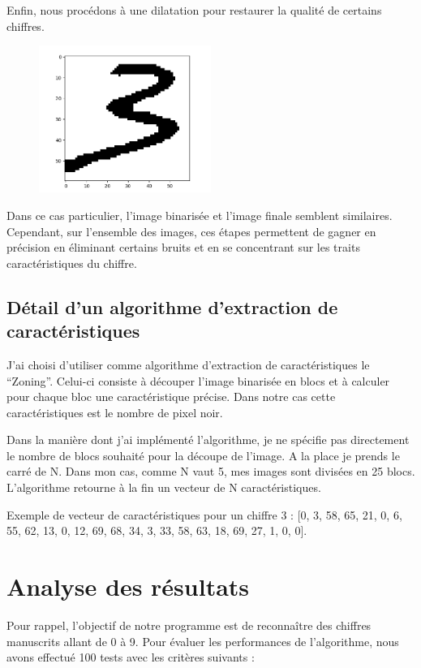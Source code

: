 \documentclass{article}
\begin{document}
Enfin, nous procédons à une dilatation pour restaurer la qualité de certains chiffres.

\begin{figure}[h!]
    \centering
    \includegraphics[width=0.5\textwidth]{images/dilatation_picture.png}
\end{figure}

Dans ce cas particulier, l'image binarisée et l'image finale semblent similaires. Cependant, sur l'ensemble des images, ces étapes permettent de gagner en précision en éliminant certains bruits et en se concentrant sur les traits caractéristiques du chiffre.

\subsection{Détail d’un algorithme d’extraction de caractéristiques}
J'ai choisi d'utiliser comme algorithme d'extraction de caractéristiques le ``Zoning''. Celui-ci consiste à découper l'image binarisée en blocs et à calculer pour chaque bloc une caractéristique précise. Dans notre cas cette caractéristiques est le nombre de pixel noir. 

Dans la manière dont j'ai implémenté l'algorithme, je ne spécifie pas directement le nombre de blocs souhaité pour la découpe de l'image. A la place je prends le carré de N. Dans mon cas, comme N vaut 5, mes images sont divisées en 25 blocs. L'algorithme retourne à la fin un vecteur de N caractéristiques. 

Exemple de vecteur de caractéristiques pour un chiffre 3 : [0, 3, 58, 65, 21, 0, 6, 55, 62, 13, 0, 12, 69, 68, 34, 3, 33, 58, 63, 18, 69, 27, 1, 0, 0].

\section{Analyse des résultats}
Pour rappel, l'objectif de notre programme est de reconnaître des chiffres manuscrits allant de 0 à 9. Pour évaluer les performances de l'algorithme, nous avons effectué 100 tests avec les critères suivants : 
\end{document}
